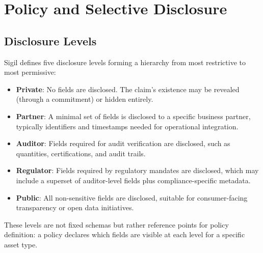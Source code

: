 \documentclass[conference]{IEEEtran}
\begin{document}

\section{Policy and Selective Disclosure}

\subsection{Disclosure Levels}

Sigil defines five disclosure levels forming a hierarchy from most restrictive
to most permissive:

\begin{itemize}
  \item \textbf{Private}: No fields are disclosed.  The claim's existence may
        be revealed (through a commitment) or hidden entirely.
  \item \textbf{Partner}: A minimal set of fields is disclosed to a specific
        business partner, typically identifiers and timestamps needed for
        operational integration.
  \item \textbf{Auditor}: Fields required for audit verification are
        disclosed, such as quantities, certifications, and audit trails.
  \item \textbf{Regulator}: Fields required by regulatory mandates are
        disclosed, which may include a superset of auditor-level fields plus
        compliance-specific metadata.
  \item \textbf{Public}: All non-sensitive fields are disclosed, suitable for
        consumer-facing transparency or open data initiatives.
\end{itemize}

These levels are not fixed schemas but rather reference points for policy
definition: a policy declares which fields are visible at each level for a
specific asset type.
\end{document}
